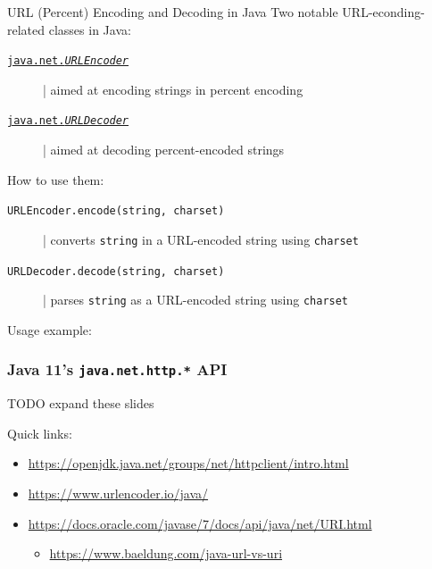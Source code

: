 \documentclass[presentation]{beamer}\mode<presentation>{\usetheme{AMSCesenaPurpleAndGold}}
\begin{document}
\begin{frame}[allowframebreaks]
    \begin{block}{URL (Percent) Encoding and Decoding in Java}
        Two notable URL-econding-related classes in Java:
        \begin{description}
            \item[\href{https://docs.oracle.com/en/java/javase/15/docs/api/java.base/java/net/URLEncoder.html}{\texttt{java.net.\textit{URLEncoder}}}] | aimed at encoding strings in percent encoding
            \item[\href{https://docs.oracle.com/en/java/javase/15/docs/api/java.base/java/net/URLDecoder.html}{\texttt{java.net.\textit{URLDecoder}}}] | aimed at decoding percent-encoded strings
        \end{description}

        \medskip

        How to use them:
        \begin{description}
            \item[\texttt{URLEncoder.encode(string, charset)}] | converts \texttt{string} in a URL-encoded string using \texttt{charset}
            \item[\texttt{URLDecoder.decode(string, charset)}] | parses \texttt{string} as a URL-encoded string using \texttt{charset}
        \end{description}
    \end{block}

    \framebreak

    Usage example:
    
\end{frame}

\begin{frame}%
    \frametitle{Java 11's \texttt{java.net.http.*} API}

    TODO expand these slides

    Quick links:
    \begin{itemize}
        \item \url{https://openjdk.java.net/groups/net/httpclient/intro.html}
        \item \url{https://www.urlencoder.io/java/}
        \item \url{https://docs.oracle.com/javase/7/docs/api/java/net/URI.html}
        \begin{itemize}
            \item \url{https://www.baeldung.com/java-url-vs-uri}
        \end{itemize}
    \end{itemize}

\end{frame}
\end{document}
